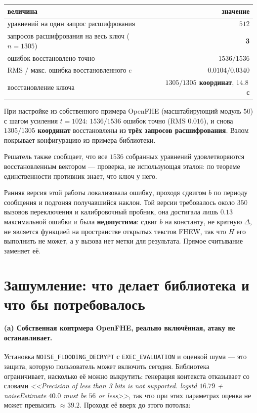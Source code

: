 \documentclass[11pt]{article}
\newcommand{\code}[1]{\texttt{#1}}
\begin{document}
\begin{table}[h]
\centering
\begin{tabular}{lr}
\toprule
величина & значение \\
\midrule
уравнений на один запрос расшифрования & $512$ \\
запросов расшифрования на весь ключ ($n = 1305$) & \textbf{3} \\
ошибок восстановлено точно & \textbf{$1536 / 1536$} \\
RMS / макс. ошибка восстановленного $e$ & $0.0104 / 0.0340$ \\
восстановление ключа & \textbf{$1305 / 1305$ координат}, $14{.}8$\,с \\
\bottomrule
\end{tabular}
\end{table}

При настройке из собственного примера OpenFHE (масштабирующий модуль $50$) с шагом усиления
$t = 1024$: $1536/1536$ ошибок точно (RMS $0.016$), и снова \textbf{$1305/1305$ координат}
восстановлены из \textbf{трёх запросов расшифрования}. Взлом покрывает конфигурацию из примера библиотеки.

Решатель также сообщает, что все $1536$ собранных уравнений удовлетворяются восстановленным вектором
--- проверка, не использующая эталон: по теореме единственности противник знает, что ключ у него.

Ранняя версия этой работы локализовала ошибку, проходя сдвигом $b$ по периоду сообщения и
подгоняя получавшийся наклон. Той версии требовалось около $350$ вызовов переключения и
калибровочный пробник, она достигала лишь $0.13$ максимальной ошибки и была
\textbf{недопустима}: сдвиг $b$ на константу, не кратную $\Delta$, не является функцией на
пространстве открытых текстов FHEW, так что $H$ его выполнить не может, а у вызова нет метки для
результата. Прямое считывание заменяет её.

\section{Зашумление: что делает библиотека и что бы потребовалось}
\label{sec:flooding}

\paragraph{(a) Собственная контрмера OpenFHE, реально включённая, атаку не останавливает.}
Установка \code{NOISE\_FLOODING\_DECRYPT} с \code{EXEC\_EVALUATION} и оценкой шума --- это защита,
которую пользователь может включить сегодня. Библиотека ограничивает, насколько её можно выкрутить:
генерация контекста отказывает со словами \emph{<<Precision of less than 3 bits is not supported.
logstd $16.79$ + noiseEstimate $40.0$ must be $56$ or less>>}, так что при этих параметрах оценка не
может превысить $\approx 39.2$. Проходя её вверх до этого потолка:
\end{document}
